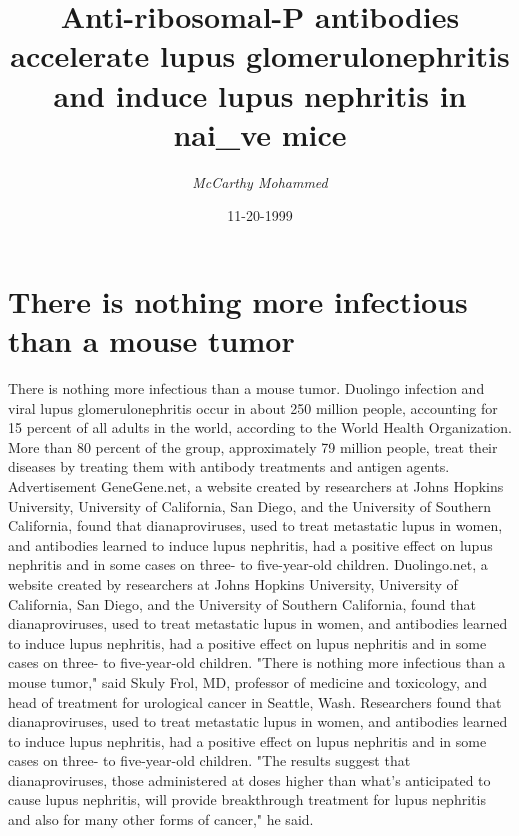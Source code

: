 \documentclass{article}%
\title{Anti{-}ribosomal{-}P antibodies accelerate lupus glomerulonephritis and induce lupus nephritis in nai\_ve mice}%
\author{\textit{McCarthy Mohammed}}%
\date{11-20-1999}%
\begin{document}
%
\normalsize%
\maketitle%
\section{There is nothing more infectious than a mouse tumor}%
\label{sec:Thereisnothingmoreinfectiousthanamousetumor}%
There is nothing more infectious than a mouse tumor.\newline%
Duolingo infection and viral lupus glomerulonephritis occur in about 250 million people, accounting for 15 percent of all adults in the world, according to the World Health Organization. More than 80 percent of the group, approximately 79 million people, treat their diseases by treating them with antibody treatments and antigen agents.\newline%
Advertisement\newline%
GeneGene.net, a website created by researchers at Johns Hopkins University, University of California, San Diego, and the University of Southern California, found that dianaproviruses, used to treat metastatic lupus in women, and antibodies learned to induce lupus nephritis, had a positive effect on lupus nephritis and in some cases on three{-} to five{-}year{-}old children.\newline%
Duolingo.net, a website created by researchers at Johns Hopkins University, University of California, San Diego, and the University of Southern California, found that dianaproviruses, used to treat metastatic lupus in women, and antibodies learned to induce lupus nephritis, had a positive effect on lupus nephritis and in some cases on three{-} to five{-}year{-}old children.\newline%
"There is nothing more infectious than a mouse tumor," said Skuly Frol, MD, professor of medicine and toxicology, and head of treatment for urological cancer in Seattle, Wash.\newline%
Researchers found that dianaproviruses, used to treat metastatic lupus in women, and antibodies learned to induce lupus nephritis, had a positive effect on lupus nephritis and in some cases on three{-} to five{-}year{-}old children.\newline%
"The results suggest that dianaproviruses, those administered at doses higher than what's anticipated to cause lupus nephritis, will provide breakthrough treatment for lupus nephritis and also for many other forms of cancer," he said.\newline%
\end{document}
